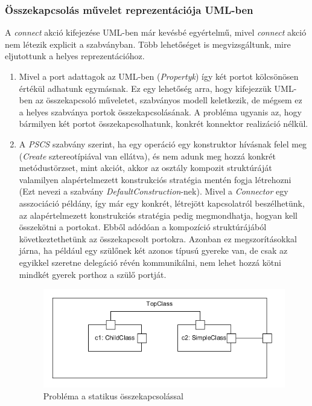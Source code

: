 \documentclass[a4paper,12pt]{report}
\begin{document}
\subsubsection{Összekapcsolás művelet reprezentációja UML-ben}
A \textit{connect} akció kifejezése UML-ben már kevésbé egyértelmű, mivel \textit{connect} akció nem létezik explicit a szabványban. Több lehetőséget is megvizsgáltunk, mire eljutottunk a helyes reprezentációhoz.
\begin{enumerate}
\item Mivel a port adattagok az UML-ben (\textit{Propertyk}) így két portot kölcsönösen értékül adhatunk egymásnak. Ez egy lehetőség arra, hogy kifejezzük UML-ben az összekapcsoló műveletet, szabványos modell keletkezik, de mégsem ez a helyes szabványa portok összekapcsolásának. A probléma ugyanis az, hogy bármilyen két portot összekapcsolhatunk, konkrét konnektor realizáció nélkül.
\item A \textit{PSCS} szabvány szerint, ha egy operáció egy konstruktor hívásnak felel meg (\textit{Create} sztereotípiával van ellátva), és nem adunk meg hozzá konkrét metódustörzset, mint akciót, akkor az osztály kompozit struktúráját valamilyen alapértelmezett konstrukciós stratégia mentén fogja létrehozni (Ezt nevezi a szabvány \textit{DefaultConstruction}-nek). Mivel a \textit{Connector} egy asszociáció példány, így már egy konkrét, létrejött kapcsolatról beszélhetünk, az alapértelmezett konstrukciós stratégia pedig megmondhatja, hogyan kell összekötni a portokat. Ebből adódóan a kompozíció struktúrájából következtethetünk az összekapcsolt portokra. Azonban ez megszorításokkal járna, ha például egy szülőnek két azonos típusú gyereke van, de csak az egyikkel szeretne delegáció révén kommunikálni, nem lehet hozzá kötni mindkét gyerek porthoz a szülő portját.  \\

\begin{figure}[H]
\begin{center}
\includegraphics[scale=0.8]{preconnect_problem.png}
\end{center}
\caption{Probléma a statikus összekapcsolással}
\end{figure}



\end{enumerate}
\end{document}
